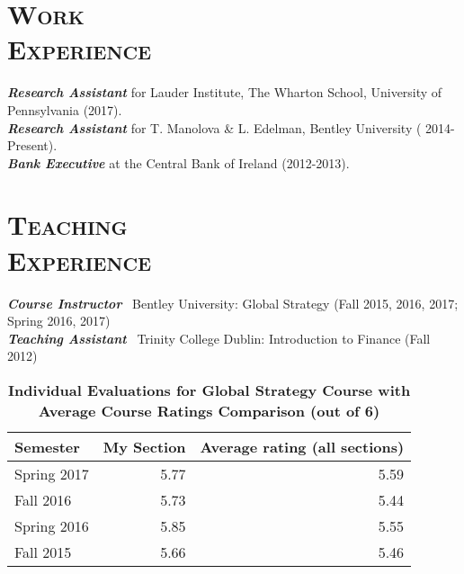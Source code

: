 \documentclass[margin, 12pt]{res}
\begin{document}
\begin{resume}
\begin{itemize}
\end{itemize}



\section{\normalfont\textsc{Work \\Experience}}
\textbf{\textit{Research Assistant}} for Lauder Institute, The Wharton School, University of Pennsylvania (2017). \\
\textbf{\textit{Research Assistant}} for T. Manolova \& L. Edelman, Bentley University ( 2014-Present). \\
\textbf{\textit{Bank Executive}} at the Central Bank of Ireland (2012-2013). 


\section{\normalfont\textsc{Teaching \\Experience}}
\textbf{\textit{Course Instructor}}~ Bentley University:
Global Strategy (Fall 2015, 2016, 2017; Spring 2016, 2017) \\
\textbf{\textit{Teaching Assistant}}~ Trinity College Dublin:
Introduction to Finance (Fall 2012)
 
%
 
\begin{table}[htbp]
  \centering
  \caption{\textbf{Individual Evaluations for Global Strategy Course	with Average Course Ratings Comparison (out of 6)}}
    \begin{tabular}{lrr}
    \midrule
    Semester & My Section & Average rating (all sections) \\
    \midrule
    Spring 2017 & 5.77  & 5.59 \\
    Fall 2016 & 5.73  & 5.44 \\
    Spring 2016 & 5.85  & 5.55 \\
    Fall 2015 & 5.66  & 5.46 \\
    \bottomrule



\end{tabular}
\end{table}
\end{resume}
\end{document}
